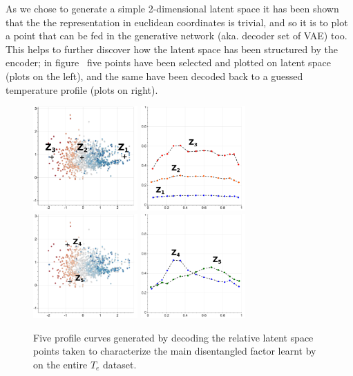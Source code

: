 As we chose to generate a simple 2-dimensional latent space it has been shown that the the representation in euclidean coordinates is trivial, and so it is to plot a point that can be fed in the generative network (aka. decoder set of VAE) too.
This helps to further discover how the latent space has been structured by the encoder; in figure~\Figure{\ref{fig:VAE2_qsh_gen}} five points have been selected and plotted on latent space (plots on the left), and the same have been decoded back to a guessed temperature profile (plots on right).
\begin{figure}
    \centering
    \includegraphics[height=4cm]{img/6_T_Hunch/ls_beta_tcentro_123.png}
    \includegraphics[height=4cm]{img/6_T_Hunch/ls_beta_tcentro_123_gen.png} \\
    \includegraphics[height=4cm]{img/6_T_Hunch/ls_beta_tcentro_45.png}
    \includegraphics[height=4cm]{img/6_T_Hunch/ls_beta_tcentro_45_gen.png}
    \caption{Five profile curves generated by decoding the relative latent space points taken to characterize the main disentangled factor learnt by  on the entire $T_e$ dataset.}
    \label{fig:VAE2_qsh_gen}
\end{figure}
